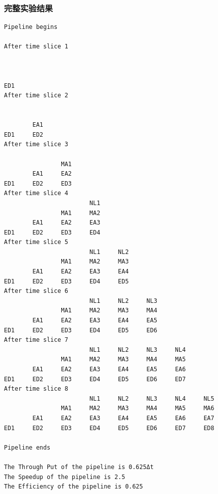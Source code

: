 \documentclass[UTF8,12pt]{article}
\begin{document}
\subsubsection{完整实验结果}
\begin{lstlisting}[frame=shadowbox]
Pipeline begins

After time slice 1



ED1
After time slice 2


        EA1
ED1     ED2
After time slice 3

                MA1
        EA1     EA2
ED1     ED2     ED3
After time slice 4
                        NL1
                MA1     MA2
        EA1     EA2     EA3
ED1     ED2     ED3     ED4
After time slice 5
                        NL1     NL2
                MA1     MA2     MA3
        EA1     EA2     EA3     EA4
ED1     ED2     ED3     ED4     ED5
After time slice 6
                        NL1     NL2     NL3
                MA1     MA2     MA3     MA4
        EA1     EA2     EA3     EA4     EA5
ED1     ED2     ED3     ED4     ED5     ED6
After time slice 7
                        NL1     NL2     NL3     NL4
                MA1     MA2     MA3     MA4     MA5
        EA1     EA2     EA3     EA4     EA5     EA6
ED1     ED2     ED3     ED4     ED5     ED6     ED7
After time slice 8
                        NL1     NL2     NL3     NL4     NL5
                MA1     MA2     MA3     MA4     MA5     MA6
        EA1     EA2     EA3     EA4     EA5     EA6     EA7
ED1     ED2     ED3     ED4     ED5     ED6     ED7     ED8

Pipeline ends

The Through Put of the pipeline is 0.625Δt
The Speedup of the pipeline is 2.5
The Efficiency of the pipeline is 0.625

\end{lstlisting}
\end{document}
